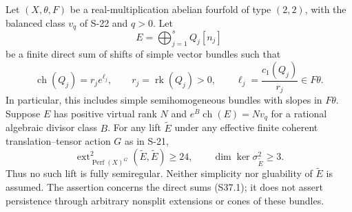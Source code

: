 \begin{theorem}
\label{thm:semireg-rm-split-semihomogeneous}
Let $(X,\theta,F)$ be a real-multiplication abelian
fourfold of type $(2,2)$, with the balanced class $v_q$
of S-22 and $q>0$. Let
\[
 E=\bigoplus_{j=1}^{s}Q_j[n_j]
 \tag{S37.1}
\]
be a finite direct sum of shifts of simple vector bundles
such that
\[
 \operatorname{ch}(Q_j)=r_j e^{\ell_j},\qquad
 r_j=\operatorname{rk}(Q_j)>0,\qquad
 \ell_j=\frac{c_1(Q_j)}{r_j}\in F\theta.
 \tag{S37.2}
\]
In particular, this includes simple semihomogeneous
bundles with slopes in $F\theta$. Suppose $E$ has
positive virtual rank $N$ and
$e^B\operatorname{ch}(E)=Nv_q$ for a rational algebraic
divisor class $B$.
For any lift $\widetilde E$ under any effective finite
coherent translation--tensor action $G$ as in S-21,
\[
 \operatorname{ext}^2_{\operatorname{Perf}(X)^G}
                  (\widetilde E,\widetilde E)\ge24,
 \qquad
 \dim\ker\sigma^2_{\widetilde E}\ge3.
 \tag{S37.3}
\]
Thus no such lift is fully semiregular. Neither
simplicity nor gluability of $\widetilde E$ is assumed.
The assertion concerns the direct sums (S37.1); it
does not assert persistence through arbitrary nonsplit
extensions or cones of these bundles.
\end{theorem}
